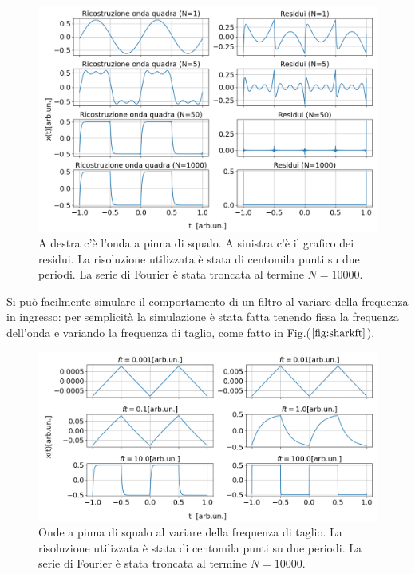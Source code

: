 \documentclass{article}
\begin{document}
                    \begin{figure}[H]
                        \centering
                        \includegraphics[width=1\textwidth]{fousharkfins1e5.png} %
                        \caption{A destra c'è l'onda a pinna di squalo.
                        A sinistra c'è il grafico dei residui.
                        La risoluzione utilizzata è stata di centomila punti su due periodi.
                        La serie di Fourier è stata troncata al termine $N=10000$.}
                        \label{fig:shark1e5}
                    \end{figure}
                Si può facilmente simulare il comportamento di  un filtro al
                variare della frequenza in ingresso: per semplicità 
                la simulazione è stata fatta tenendo fissa la frequenza dell'onda e 
                variando la frequenza di taglio, come fatto in Fig.($\ref{fig:sharkft}$).
                    \begin{figure}[H]
                        \centering
                        \includegraphics[width=1\textwidth]{fousharkfinsfts1.png} %
                        \caption{Onde a pinna di squalo al variare della frequenza di taglio.
                        La risoluzione utilizzata è stata di centomila punti su due periodi.
                        La serie di Fourier è stata troncata al termine $N=10000$.}
                        \label{fig:sharkft}
                    \end{figure}
\end{document}
